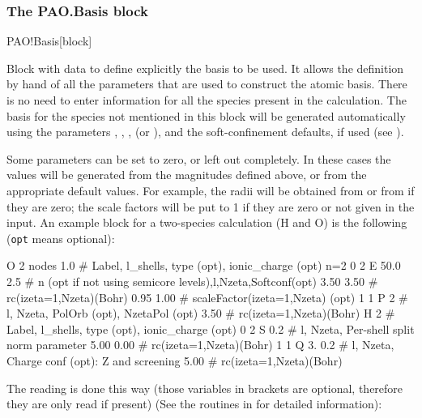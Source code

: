 \subsubsection{The PAO.Basis block}

\begin{fdfentry}{PAO!Basis}[block]

  Block with data to define explicitly the basis to be used.  It
  allows the definition by hand of all the parameters that are used to
  construct the atomic basis. There is no need to enter information
  for all the species present in the calculation. The
  basis for the species not mentioned in this block
  will be generated automatically using the parameters
  , , ,
   (or ), and the
  soft-confinement defaults, if used (see ).

  Some parameters can be set to zero, or left out completely.  In
  these cases the values will be generated from the magnitudes defined
  above, or from the appropriate default values. For example, the
  radii will be obtained from
   or from  if they are
  zero; the scale factors will be put to 1 if they are zero or not
  given in the input.  An example block for a two-species calculation
  (H and O) is the following (\texttt{opt} means optional):
  
  \begin{fdfexample}
O    2  nodes  1.0   # Label, l_shells, type (opt), ionic_charge (opt)
 n=2 0 2  E 50.0 2.5 # n (opt if not using semicore levels),l,Nzeta,Softconf(opt)
     3.50  3.50      #     rc(izeta=1,Nzeta)(Bohr)
     0.95  1.00      #     scaleFactor(izeta=1,Nzeta) (opt)
     1 1  P 2        # l, Nzeta, PolOrb (opt), NzetaPol (opt)
     3.50            #     rc(izeta=1,Nzeta)(Bohr)
H    2               # Label, l_shells, type (opt), ionic_charge (opt)
     0 2 S 0.2       # l, Nzeta, Per-shell split norm parameter
     5.00  0.00      #     rc(izeta=1,Nzeta)(Bohr)
     1 1 Q 3. 0.2    # l, Nzeta, Charge conf (opt): Z and screening
     5.00            #    rc(izeta=1,Nzeta)(Bohr)
  \end{fdfexample}
   

  \noindent
  The reading is done this way (those variables in brackets are
  optional, therefore they are only read if present) (See
  the routines in  for detailed information):
  

\end{fdfentry}
